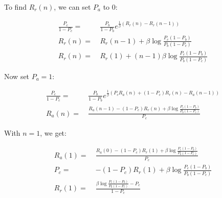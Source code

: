 \documentclass{article}
\begin{document}
\pagebreak

To find $R_r(n)$, we can set $P_a$ to $0$:

\begin{align*}
  \frac{P_c}{1 - P_c} = \: & \frac{P_b}{1 - P_b} e^{\frac{1}{\beta} \left(R_r(n) - R_r(n-1)\right)} \\
  R_r(n) = \:              & R_r(n-1) + \beta \log \frac{P_c (1 - P_b)}{P_b(1 - P_c)}               \\
  R_r(n) = \:              & R_r(1) + (n - 1) \beta \log \frac{P_c (1 - P_b)}{P_b(1 - P_c)}
\end{align*}

Now set $P_a = 1$:

\begin{align*}
  \frac{P_c}{1 - P_c} = \: & \frac{P_b}{1 - P_b} e^{\frac{1}{\beta} \left(P_cR_a(n) + (1 - P_c)R_r(n) - R_a(n - 1)\right)} \\
  R_a(n) = \:              & \frac{R_a(n - 1) - (1 - P_c)R_r(n) + \beta \log \frac{P_c (1 - P_b)}{P_b (1 - P_c)}}{P_c}
\end{align*}

With $n = 1$, we get:

\begin{align*}
  R_a(1) = \: & \frac{R_a(0) - (1 - P_c)R_r(1) + \beta \log \frac{P_c (1 - P_b)}{P_b (1 - P_c)}}{P_c} \\
  P_c = \:    & - (1 - P_c)R_r(1) + \beta \log \frac{P_c (1 - P_b)}{P_b (1 - P_c)}                    \\
  R_r(1) = \: & \frac{\beta \log \frac{P_c (1 - P_b)}{P_b (1 - P_c)} - P_c}{1 - P_c}
\end{align*}
\end{document}

